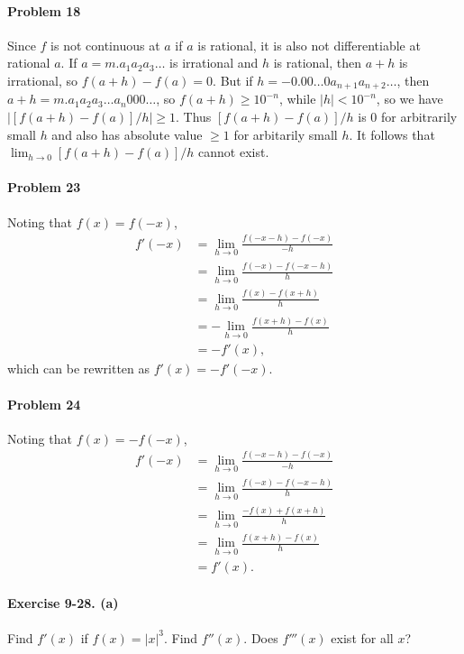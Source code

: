 \documentclass{article}
\begin{document}
\paragraph{Problem 18} Since $f$ is not continuous at $a$ if $a$ is rational,
it is also not differentiable at rational $a$. If $a = m.a_1a_2a_3\ldots$ is
irrational and $h$ is rational, then $a + h$ is irrational, so $f(a + h) - f(a)
= 0$. But if $h = -0.00\ldots0a_{n+1}a_{n+2}\ldots$, then $a + h = m.a_1a_2a_3
\ldots a_n000\ldots$, so $f(a + h) \geq 10^{-n}$, while $|h| < 10^{-n}$, so we
have $|[f(a + h) - f(a)]/h| \geq 1$. Thus $[f(a + h) - f(a)]/h$ is 0 for
arbitrarily small $h$ and also has absolute value $\geq 1$ for arbitarily small
$h$. It follows that $\lim_{h \to 0} [f(a + h) - f(a)]/h$ cannot exist.

\paragraph{Problem 23} Noting that $f(x) = f(-x)$,
\begin{align*}
  f'(-x) &= \lim_{h \to 0}\frac{f(-x - h) - f(-x)}{-h} \\
         &= \lim_{h \to 0}\frac{f(-x) - f(-x - h)}{h} \\
         &= \lim_{h \to 0}\frac{f(x) - f(x + h)}{h} \\
         &= -\lim_{h \to 0}\frac{f(x + h) - f(x)}{h} \\
         &= -f'(x),
\end{align*}
which can be rewritten as $f'(x) = -f'(-x)$.

\paragraph{Problem 24} Noting that $f(x) = -f(-x)$,
\begin{align*}
  f'(-x) &= \lim_{h \to 0}\frac{f(-x - h) - f(-x)}{-h} \\
         &= \lim_{h \to 0}\frac{f(-x) - f(-x - h)}{h} \\
         &= \lim_{h \to 0}\frac{-f(x) + f(x + h)}{h} \\
         &= \lim_{h \to 0}\frac{f(x + h) - f(x)}{h} \\
         &= f'(x).
\end{align*}

\paragraph{Exercise 9-28. (a)} Find $f'(x)$ if $f(x) = |x|^3$. Find $f''(x)$.
Does $f'''(x)$ exist for all $x$?
\end{document}
